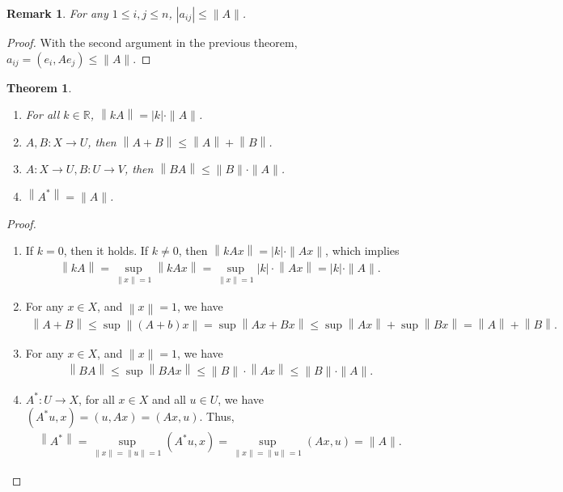\documentclass[10pt]{book}
\newtheorem{theorem}{Theorem}[chapter]
\newtheorem{remark}{Remark}[chapter]
\theoremstyle{definition}
\numberwithin{equation}{chapter}
\begin{document}
\begin{remark}
For any $1\leq i,j\leq n$, $\left|a_{ij}\right| \leq \|A\|$.
\end{remark}
\begin{proof}
With the second argument in the previous theorem, $a_{ij} = (e_i,Ae_j) \leq \|A\|$.
\end{proof}

\medskip

\begin{theorem}
~\begin{enumerate}[label=(\alph*)]
    \item For all $k\in\mathbb{R}$, $\left\|kA\right\| = |k|\cdot \|A\|$.
    \item $A,B:X\to U$, then $\left\|A + B\right\| \leq \left\|A\right\| + \left\|B\right\|$.
    \item $A:X\to U, B:U\to V$, then $\left\|BA\right\| \leq \|B\|\cdot \|A\|$.
    \item $\left\|A^*\right\| = \|A\|$.
\end{enumerate}
\end{theorem}
\begin{proof}
~\begin{enumerate}[label=(\alph*)]
    \item If $k = 0$, then it holds. If $k\neq 0$, then $\left\|kAx\right\| = |k| \cdot \|Ax\|$, which implies
    \begin{align*}
        \left\|kA\right\| = \sup_{\|x\|=1} \left\|kAx\right\| = \sup_{\|x\|=1} |k| \cdot \left\|Ax\right\| = |k|\cdot \|A\|.
    \end{align*}
    \item For any $x\in X$, and $\left\|x\right\| = 1$, we have 
    \begin{align*}
        \left\|A + B\right\| \leq \sup \left\|(A+b)x\right\| = \sup \left\|Ax + Bx\right\| \leq \sup \left\|Ax\right\| + \sup \left\|Bx\right\| = \left\|A\right\| + \left\|B\right\|.
    \end{align*}
    \item For any $x\in X$, and $\|x\| = 1$, we have 
    \begin{align*}
        \left\|BA\right\| \leq \sup \left\|BAx\right\| \leq \|B\|\cdot \left\|Ax\right\| \leq \|B\|\cdot \|A\|.
    \end{align*}
    \item $A^*:U\to X$, for all $x\in X$ and all $u\in U$, we have $(A^* u, x) = (u, Ax) = (Ax, u)$. Thus, 
    \begin{align*}
        \left\|A^*\right\| = \sup_{\|x\| = \|u\| = 1} (A^*u,x) = \sup_{\|x\| = \|u\| = 1} (Ax,u) = \|A\|.
    \end{align*}
\end{enumerate}
\end{proof}
\end{document}
